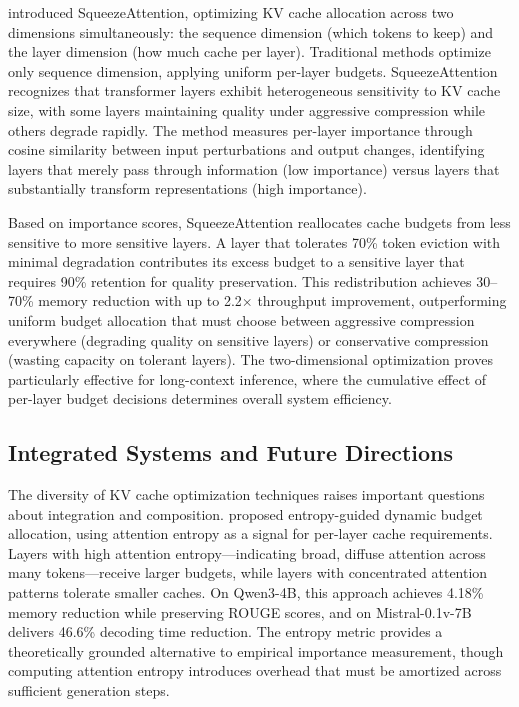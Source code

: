 \citet{li2024squeezeattention} introduced SqueezeAttention, optimizing KV cache allocation across two dimensions simultaneously: the sequence dimension (which tokens to keep) and the layer dimension (how much cache per layer). Traditional methods optimize only sequence dimension, applying uniform per-layer budgets. SqueezeAttention recognizes that transformer layers exhibit heterogeneous sensitivity to KV cache size, with some layers maintaining quality under aggressive compression while others degrade rapidly. The method measures per-layer importance through cosine similarity between input perturbations and output changes, identifying layers that merely pass through information (low importance) versus layers that substantially transform representations (high importance).

Based on importance scores, SqueezeAttention reallocates cache budgets from less sensitive to more sensitive layers. A layer that tolerates 70\% token eviction with minimal degradation contributes its excess budget to a sensitive layer that requires 90\% retention for quality preservation. This redistribution achieves 30--70\% memory reduction with up to 2.2$\times$ throughput improvement, outperforming uniform budget allocation that must choose between aggressive compression everywhere (degrading quality on sensitive layers) or conservative compression (wasting capacity on tolerant layers). The two-dimensional optimization proves particularly effective for long-context inference, where the cumulative effect of per-layer budget decisions determines overall system efficiency.

\subsection{Integrated Systems and Future Directions}

The diversity of KV cache optimization techniques raises important questions about integration and composition. \citet{kang2024entropy} proposed entropy-guided dynamic budget allocation, using attention entropy as a signal for per-layer cache requirements. Layers with high attention entropy---indicating broad, diffuse attention across many tokens---receive larger budgets, while layers with concentrated attention patterns tolerate smaller caches. On Qwen3-4B, this approach achieves 4.18\% memory reduction while preserving ROUGE scores, and on Mistral-0.1v-7B delivers 46.6\% decoding time reduction. The entropy metric provides a theoretically grounded alternative to empirical importance measurement, though computing attention entropy introduces overhead that must be amortized across sufficient generation steps.

